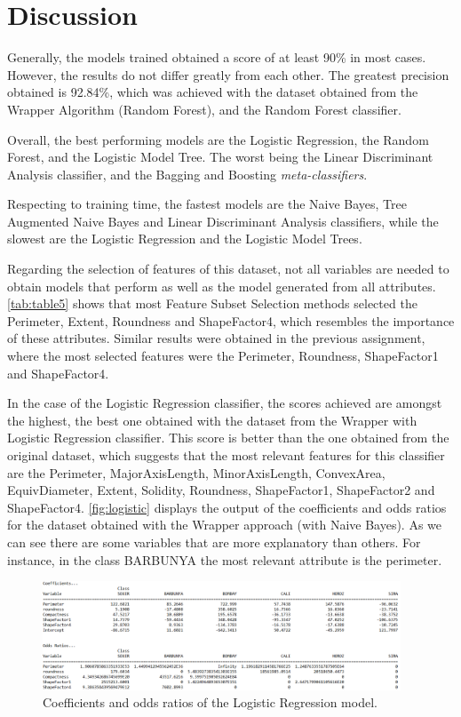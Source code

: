 \documentclass[a4paper,11pt]{article}
\begin{document}
\section{Discussion}
\label{sec:discussion}

Generally, the models trained obtained a score of at least 90\% in most cases. However, the results do not differ greatly from each other. The greatest precision obtained is 92.84\%, which was achieved with the dataset obtained from the Wrapper Algorithm (Random Forest), and the Random Forest classifier.

Overall, the best performing models are the Logistic Regression, the Random Forest, and the Logistic Model Tree. The worst being the Linear Discriminant Analysis classifier, and the Bagging and Boosting \textit{meta-classifiers}.

Respecting to training time, the fastest models are the Naive Bayes, Tree Augmented Naive Bayes and Linear Discriminant Analysis classifiers, while the slowest are the Logistic Regression and the Logistic Model Trees.

Regarding the selection of features of this dataset, not all variables are needed to obtain models that perform as well as the model generated from all attributes. \autoref{tab:table5} shows that most Feature Subset Selection methods selected the Perimeter, Extent, Roundness and ShapeFactor4, which resembles the importance of these attributes. Similar results were obtained in the previous assignment, where the most selected features were the Perimeter, Roundness, ShapeFactor1 and ShapeFactor4.

In the case of the Logistic Regression classifier, the scores achieved are amongst the highest, the best one obtained with the dataset from the Wrapper with Logistic Regression classifier. This score is better than the one obtained from the original dataset, which suggests that the most relevant features for this classifier are the Perimeter, MajorAxisLength, MinorAxisLength, ConvexArea, EquivDiameter, Extent, Solidity, Roundness, ShapeFactor1, ShapeFactor2 and ShapeFactor4. \autoref{fig:logistic} displays the output of the coefficients and odds ratios for the dataset obtained with the Wrapper approach (with Naive Bayes). As we can see there are some variables that are more explanatory than others. For instance, in the class BARBUNYA the most relevant attribute is the perimeter.

\begin{figure}[h]
\centering
\includegraphics[width=0.95\textwidth]{logistic}
\caption{Coefficients and odds ratios of the Logistic Regression model.}
\label{fig:logistic}
\end{figure}
\end{document}
